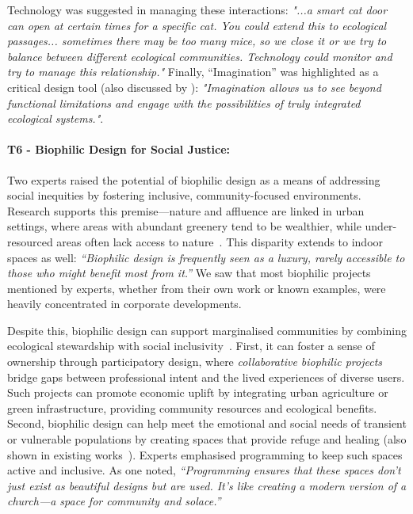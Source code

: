 Technology was suggested in managing these interactions: \textit{"...a smart cat door can open at certain times for a specific cat. You could extend this to ecological passages... sometimes there may be too many mice, so we close it or we try to balance between different ecological communities. Technology could monitor and try to manage this relationship."} Finally, ``Imagination'' was highlighted as a critical design tool (also discussed by \citet{fernandez2024green}): \textit{"Imagination allows us to see beyond functional limitations and engage with the possibilities of truly integrated ecological systems."}.


\paragraph{T6 - Biophilic Design for Social Justice:}
\label{theme:t6}
Two experts raised the potential of biophilic design as a means of addressing social inequities by fostering inclusive, community-focused environments. Research supports this premise---nature and affluence are linked in urban settings, where areas with abundant greenery tend to be wealthier, while under-resourced areas often lack access to nature~\cite{wolch2014urban}. This disparity extends to indoor spaces as well: \textit{“Biophilic design is frequently seen as a luxury, rarely accessible to those who might benefit most from it.”} We saw that most biophilic projects mentioned by experts, whether from their own work or known examples, were heavily concentrated in corporate developments.

Despite this, biophilic design can support marginalised communities by combining ecological stewardship with social inclusivity~\cite{panlasigui2021biophilia}. First, it can foster a sense of ownership through participatory design, where \emph{collaborative biophilic projects} bridge gaps between professional intent and the lived experiences of diverse users. Such projects can promote economic uplift by integrating urban agriculture or green infrastructure, providing community resources and ecological benefits. Second, biophilic design can help meet the emotional and social needs of transient or vulnerable populations by creating spaces that provide refuge and healing (also shown in existing works~\cite{tidballurgent, chow2020site}). Experts emphasised programming to keep such spaces active and inclusive. As one noted, \textit{“Programming ensures that these spaces don’t just exist as beautiful designs but are used. It’s like creating a modern version of a church---a space for community and solace.”} 

